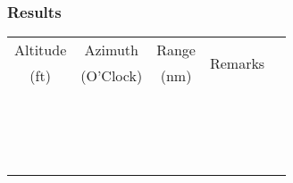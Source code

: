 % 
% 
%
\Large
\subsubsection*{Results}
  \settowidth{\colFive}{Remarks}

  \begin{tabularx}{\textwidth}{|c|c|c|lX|}
    \hline
Altitude&Azimuth&Range&\multirow{2}{\colFive}{\centering Remarks}&\\
(ft)&(O'Clock)&(nm)&&\\
    \hline
    \hline
    &&&&\\
    \hline
    &&&&\\
    \hline
    &&&&\\
    \hline
    &&&&\\
    \hline
    &&&&\\
    \hline
    &&&&\\
    \hline
    &&&&\\
    \hline
    &&&&\\
    \hline
    &&&&\\
    \hline
    &&&&\\
    \hline
    &&&&\\
    \hline
    &&&&\\
    \hline
    &&&&\\
    \hline
    &&&&\\
    \hline
    &&&&\\
    \hline
    &&&&\\
    \hline
    \end{tabularx}     
    \normalsize

   